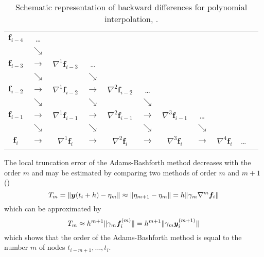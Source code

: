 \begin{table}[]
    \centering
    \begin{tabular}{ccccccccccc}
        $\bm{f}_{i-4}$ & \dots &&&&&\\ 
        & $\searrow$ &&&&& \\ 
        $\bm{f}_{i-3}$ & $\rightarrow$ & $\nabla ^1 \bm{f}_{i-3}$ & \dots &&&&\\ 
        & $\searrow$ & & $\searrow$ &&& \\ 
        $\bm{f}_{i-2}$ & $\rightarrow$ & $\nabla ^1 \bm{f}_{i-2}$ & $\rightarrow$ & $\nabla ^2 \bm{f}_{i-2}$ & \dots &&& \\ 
        & $\searrow$ && $\searrow$ && $\searrow$ & \\ 
        $\bm{f}_{i-1}$ & $\rightarrow$ & $\nabla ^1 \bm{f}_{i-1}$ & $\rightarrow$ & $\nabla ^2 \bm{f}_{i-1}$ & $\rightarrow$  & $\nabla ^3 \bm{f}_{i-1}$ & \dots && \\ 
        & $\searrow$ && $\searrow$ && $\searrow$ &&  $\searrow$ \\ 
        $\bm{f}_{i}$   & $\rightarrow$ & $\nabla ^1 \bm{f}_{i}$   & $\rightarrow$ & $\nabla ^2 \bm{f}_{i}$   & $\rightarrow$  & $\nabla ^3 \bm{f}_{i}$   & $\rightarrow$  & $\nabla ^4 \bm{f}_{i}$ & \dots & \\ 
    \end{tabular}
    \caption{Schematic representation of backward differences for polynomial interpolation, \cite{Montenbruck2000}.}
    \label{tab:backward-differences-ab}
  \end{table}

The local truncation error of the Adams-Bashforth method decreases with the
order $m$ and may be estimated by comparing two methods of order $m$ and $m+1$ 
(\cite{Montenbruck2000})
\begin{equation}\label{eq:mont457}
    T_{m} = \lVert\bm{y}(t_i +h) - \eta _{m}\rVert \approx \lVert\eta _{m+1} - \eta _{m}\rVert 
    = h \lVert\gamma _m \nabla ^m \bm{f}_i\rVert
\end{equation}
which can be approximated by
\begin{equation}
    T_{m} \approx h^{m+1} \lVert\gamma _m \bm{f}^{(m)}_{i}\rVert = h^{m+1} \lVert\gamma _m \bm{y}^{(m+1)}_{i}\rVert
\end{equation}
which shows that the order of the Adams-Bashforth method is equal to the number
$m$ of nodes $t_{i-m+1}, \dots , t_i$.

